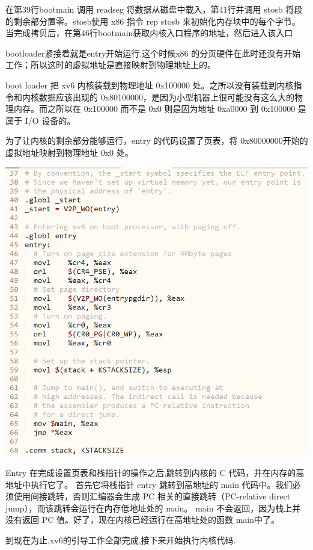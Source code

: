在第39行bootmain 调用 readseg 将数据从磁盘中载入，第41行并调用 stosb 将段的剩余部分置零。stosb使用 x86 指令 rep stosb 来初始化内存块中的每个字节。当完成拷贝后，在第46行bootmain获取内核入口程序的地址，然后进入该入口

bootloader紧接着就是entry开始运行,这个时候x86 的分页硬件在此时还没有开始工作；所以这时的虚拟地址是直接映射到物理地址上的。

boot loader 把 xv6 内核装载到物理地址 0x100000 处。之所以没有装载到内核指令和内核数据应该出现的 0x80100000，是因为小型机器上很可能没有这么大的物理内存。而之所以在 0x100000 而不是 0x0 则是因为地址 0xa0000 到 0x100000 是属于 I/O 设备的。

为了让内核的剩余部分能够运行，entry 的代码设置了页表，将 0x80000000开始的虚拟地址映射到物理地址 0x0 处。

\includegraphics[width=6in]{figures/boot/fig10.png}

Entry 在完成设置页表和栈指针的操作之后,跳转到内核的 C 代码，并在内存的高地址中执行它了。
首先它将栈指针 %
entry 跳转到高地址的 main 代码中。我们必须使用间接跳转，否则汇编器会生成 PC 相关的直接跳转（PC-relative direct jump），而该跳转会运行在内存低地址处的 main。 main 不会返回，因为栈上并没有返回 PC 值。好了，现在内核已经运行在高地址处的函数 main中了。

到现在为止,xv6的引导工作全部完成,接下来开始执行内核代码.
